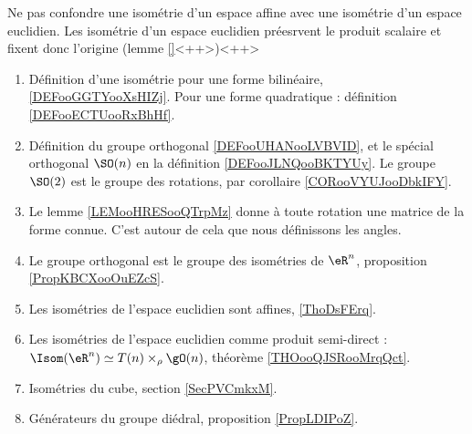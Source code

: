 
      \label{THMooVUCLooCrdbxm}

Ne pas confondre une isométrie d'un espace affine avec une isométrie d'un espace euclidien. Les isométrie d'un espace euclidien préesrvent le produit scalaire et fixent donc l'origine (lemme \ref{}<++>)<++>

\begin{enumerate}
    \item 
        Définition d'une isométrie pour une forme bilinéaire, \ref{DEFooGGTYooXsHIZj}. Pour une forme quadratique : définition \ref{DEFooECTUooRxBhHf}.
    \item
        Définition du groupe orthogonal \ref{DEFooUHANooLVBVID}, et le spécial orthogonal \( \SO(n)\) en la définition \ref{DEFooJLNQooBKTYUy}. Le groupe \( \SO(2)\) est le groupe des rotations, par corollaire \ref{CORooVYUJooDbkIFY}.
    \item
        Le lemme \ref{LEMooHRESooQTrpMz} donne à toute rotation une matrice de la forme connue. C'est autour de cela que nous définissons les angles.
    \item
        Le groupe orthogonal est le groupe des isométries de \( \eR^n\), proposition \ref{PropKBCXooOuEZcS}.
    \item
        Les isométries de l'espace euclidien sont affines, \ref{ThoDsFErq}.
    \item
        Les isométries de l'espace euclidien comme produit semi-direct : $\Isom(\eR^n)\simeq T(n)\times_{\rho}\gO(n)$, théorème \ref{THOooQJSRooMrqQct}.
    \item
        Isométries du cube, section \ref{SecPVCmkxM}.
    \item 
        Générateurs du groupe diédral, proposition \ref{PropLDIPoZ}.
\end{enumerate}

